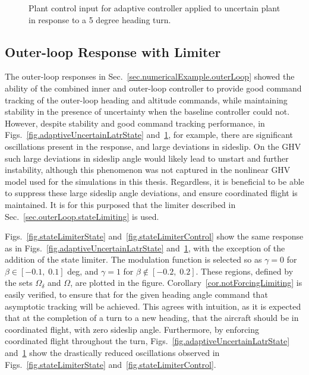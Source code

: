\newpage
\begin{figure}[H]
  \hspace{-0.5in}
  \noindent{}
  \vspace{-1.0in}
  \caption{Plant control input for adaptive controller applied to uncertain plant in response to a 5 degree heading turn.\label{fig.adaptiveUncertainLatrControl}}
\end{figure}

\subsection{Outer-loop Response with Limiter}

The outer-loop responses in Sec.~\ref{sec.numericalExample.outerLoop} showed the ability of the combined inner and outer-loop controller to provide good command tracking of the outer-loop heading and altitude commands, while maintaining stability in the presence of uncertainty when the baseline controller could not.
However, despite stability and good command tracking performance, in Figs.~\ref{fig.adaptiveUncertainLatrState} and~\ref{fig.adaptiveUncertainLatrControl}, for example, there are significant oscillations present in the response, and large deviations in sideslip.
On the GHV such large deviations in sideslip angle would likely lead to unstart and further instability, although this phenomenon was not captured in the nonlinear GHV model used for the simulations in this thesis.
Regardless, it is beneficial to be able to suppress these large sideslip angle deviations, and ensure coordinated flight is maintained.
It is for this purposed that the limiter described in Sec.~\ref{sec.outerLoop.stateLimiting} is used.

Figs.~\ref{fig.stateLimiterState} and~\ref{fig.stateLimiterControl} show the same response as in Figs.~\ref{fig.adaptiveUncertainLatrState} and~\ref{fig.adaptiveUncertainLatrControl}, with the exception of the addition of the state limiter.
The modulation function is selected so as $\gamma=0$ for $\beta\in[-0.1,\;0.1]$ deg, and $\gamma=1$ for $\beta\notin[-0.2,\;0.2]$.
These regions, defined by the sets $\Omega_{\delta}$ and $\Omega$, are plotted in the figure.
Corollary~\ref{cor.notForcingLimiting} is easily verified, to ensure that for the given heading angle command that asymptotic tracking will be achieved.
This agrees with intuition, as it is expected that at the completion of a turn to a new heading, that the aircraft should be in coordinated flight, with zero sideslip angle.
Furthermore, by enforcing coordinated flight throughout the turn, Figs.~\ref{fig.adaptiveUncertainLatrState} and~\ref{fig.adaptiveUncertainLatrControl} show the drastically reduced oscillations observed in Figs.~\ref{fig.stateLimiterState} and~\ref{fig.stateLimiterControl}.

